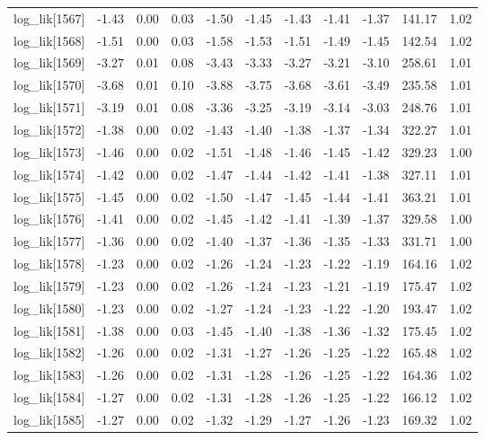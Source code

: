 \begin{table}[ht]
\begin{tabular}{rrrrrrrrrrr}
  log\_lik[1567] & -1.43 & 0.00 & 0.03 & -1.50 & -1.45 & -1.43 & -1.41 & -1.37 & 141.17 & 1.02 \\ 
  log\_lik[1568] & -1.51 & 0.00 & 0.03 & -1.58 & -1.53 & -1.51 & -1.49 & -1.45 & 142.54 & 1.02 \\ 
  log\_lik[1569] & -3.27 & 0.01 & 0.08 & -3.43 & -3.33 & -3.27 & -3.21 & -3.10 & 258.61 & 1.01 \\ 
  log\_lik[1570] & -3.68 & 0.01 & 0.10 & -3.88 & -3.75 & -3.68 & -3.61 & -3.49 & 235.58 & 1.01 \\ 
  log\_lik[1571] & -3.19 & 0.01 & 0.08 & -3.36 & -3.25 & -3.19 & -3.14 & -3.03 & 248.76 & 1.01 \\ 
  log\_lik[1572] & -1.38 & 0.00 & 0.02 & -1.43 & -1.40 & -1.38 & -1.37 & -1.34 & 322.27 & 1.01 \\ 
  log\_lik[1573] & -1.46 & 0.00 & 0.02 & -1.51 & -1.48 & -1.46 & -1.45 & -1.42 & 329.23 & 1.00 \\ 
  log\_lik[1574] & -1.42 & 0.00 & 0.02 & -1.47 & -1.44 & -1.42 & -1.41 & -1.38 & 327.11 & 1.01 \\ 
  log\_lik[1575] & -1.45 & 0.00 & 0.02 & -1.50 & -1.47 & -1.45 & -1.44 & -1.41 & 363.21 & 1.01 \\ 
  log\_lik[1576] & -1.41 & 0.00 & 0.02 & -1.45 & -1.42 & -1.41 & -1.39 & -1.37 & 329.58 & 1.00 \\ 
  log\_lik[1577] & -1.36 & 0.00 & 0.02 & -1.40 & -1.37 & -1.36 & -1.35 & -1.33 & 331.71 & 1.00 \\ 
  log\_lik[1578] & -1.23 & 0.00 & 0.02 & -1.26 & -1.24 & -1.23 & -1.22 & -1.19 & 164.16 & 1.02 \\ 
  log\_lik[1579] & -1.23 & 0.00 & 0.02 & -1.26 & -1.24 & -1.23 & -1.21 & -1.19 & 175.47 & 1.02 \\ 
  log\_lik[1580] & -1.23 & 0.00 & 0.02 & -1.27 & -1.24 & -1.23 & -1.22 & -1.20 & 193.47 & 1.02 \\ 
  log\_lik[1581] & -1.38 & 0.00 & 0.03 & -1.45 & -1.40 & -1.38 & -1.36 & -1.32 & 175.45 & 1.02 \\ 
  log\_lik[1582] & -1.26 & 0.00 & 0.02 & -1.31 & -1.27 & -1.26 & -1.25 & -1.22 & 165.48 & 1.02 \\ 
  log\_lik[1583] & -1.26 & 0.00 & 0.02 & -1.31 & -1.28 & -1.26 & -1.25 & -1.22 & 164.36 & 1.02 \\ 
  log\_lik[1584] & -1.27 & 0.00 & 0.02 & -1.31 & -1.28 & -1.26 & -1.25 & -1.22 & 166.12 & 1.02 \\ 
  log\_lik[1585] & -1.27 & 0.00 & 0.02 & -1.32 & -1.29 & -1.27 & -1.26 & -1.23 & 169.32 & 1.02 \\ 

\end{tabular}
\end{table}
